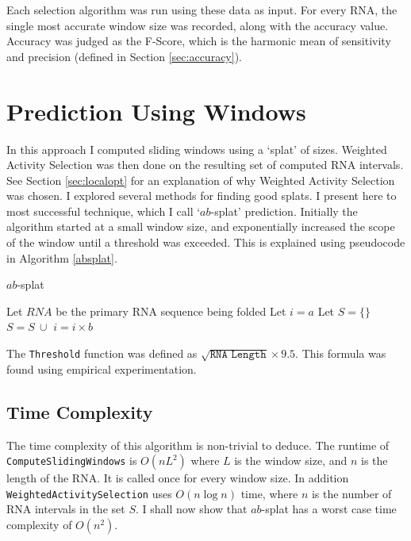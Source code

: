 \documentclass{cshonours}
\begin{document}
Each selection algorithm was run using these data as input. For every RNA, the single most accurate window size was recorded, along with the accuracy value. Accuracy was judged as the F-Score, which is the harmonic mean of sensitivity and precision (defined in Section \ref{sec:accuracy}).




\section{Prediction Using Windows}
In this approach I computed sliding windows using a `splat' of sizes. Weighted Activity Selection was then done on the resulting set of computed RNA intervals. See Section \ref{sec:localopt} for an explanation of why Weighted Activity Selection was chosen. I explored several methods for finding good splats. I present here to most successful technique, which I call `$ab$-splat' prediction. Initially the algorithm started at a small window size, and exponentially increased the scope of the window until a threshold was exceeded. This is explained using pseudocode in Algorithm \ref{absplat}.

\begin{algorithm}
  \caption{$ab$-splat}
  \label{absplat}
  \begin{algorithmic}[1]
  \State Let $RNA$ be the primary RNA sequence being folded
  \State Let $i = a$
  \State Let $S = \{\}$
  	\State $S = S \: \cup $ 
  	\State $i = i \times b$
  \EndWhile
  \State \Return {}
  \end{algorithmic}
\end{algorithm}

The \texttt{Threshold} function was defined as $\sqrt{ \texttt{RNA Length} } \times 9.5$. This formula was found using empirical experimentation.

\subsection{Time Complexity}

The time complexity of this algorithm is non-trivial to deduce. The runtime of \texttt{ComputeSlidingWindows} is $O(nL^2)$ where $L$ is the window size, and $n$ is the length of the RNA. It is called once for every window size. In addition \texttt{WeightedActivitySelection} uses $O(n \log n)$ time, where $n$ is the number of RNA intervals in the set $S$. I shall now show that $ab$-splat has a worst case time complexity of $O(n^2)$.
\end{document}
